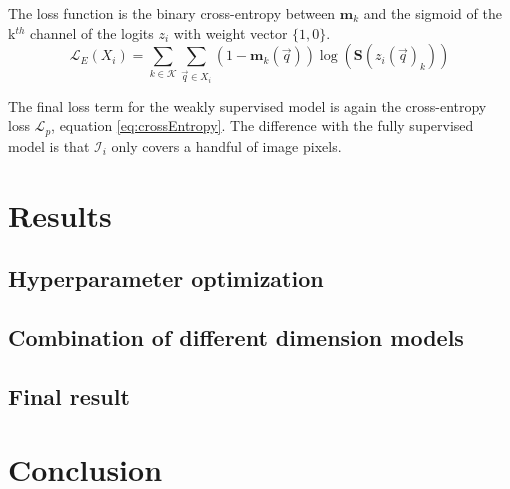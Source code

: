 \begin{multicols}{2}
{    The loss function is the binary cross-entropy between $\mathbf{m}_k$ and the sigmoid of the k$^{th}$ channel of the logits $z_i$ with weight vector $\{1, 0\}$.
}
\begin{equation}
    \mathcal{L}_E(X_i) = \sum_{k\in\mathcal{K}}\sum_{\vec{q}\in X_i}  (1-\mathbf{m}_k(\vec{q})) \log(\mathbf{S}(z_i(\vec{q})_k)) 
\end{equation}
\par{
    The final loss term for the weakly supervised model is again the cross-entropy loss $\mathcal{L}_p$, equation \ref{eq:crossEntropy}. 
    The difference with the fully supervised model is that $\mathcal{I}_i$ only covers a handful of image pixels.
}


\section*{Results}
\subsection*{Hyperparameter optimization}

\subsection*{Combination of different dimension models}

\subsection*{Final result}

\section*{Conclusion}
\cleardoublepage
\end{multicols}